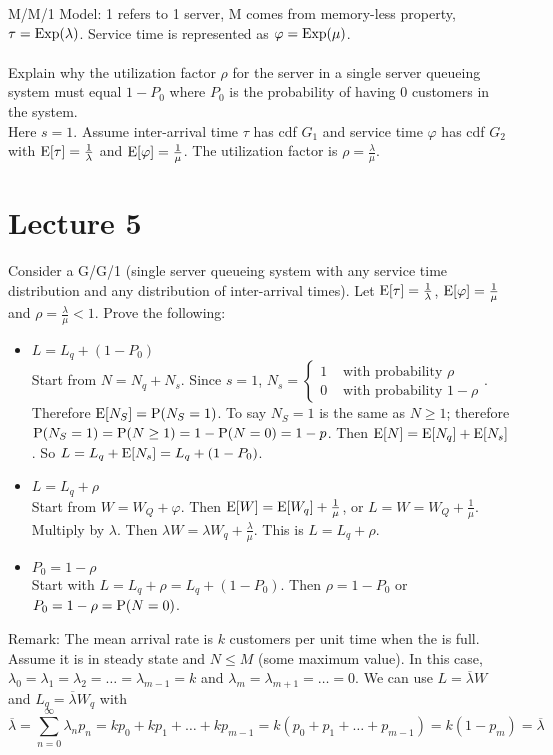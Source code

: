 \documentclass[12pt]{article}
\begin{document}
 M/M/1 Model: 1 refers to 1 server, M comes from memory-less property, $\tau = \text{Exp}( \lambda )$. Service time is represented as $\varphi = \text{Exp}( \mu )$. \\~\\
 Explain why the utilization factor $\rho$ for the server in a single server queueing system must equal $1 - P_0$ where $P_0$ is the probability of having $0$ customers in the system. \\ Here $s = 1$. Assume inter-arrival time $\tau$ has cdf $G_1$ and service time $\varphi$ has cdf $G_2$ with $\mathrm{E}[ \tau ] = \frac{1}{\lambda}$ and $\mathrm{E}[ \varphi ] = \frac{1}{\mu}$. The utilization factor is $\rho = \frac{\lambda}{\mu}$. 
 
  \section{Lecture 5}
 Consider a G/G/1 (single server queueing system with any service time distribution and any distribution of inter-arrival times). Let $\mathrm{E}[ \tau ] = \frac{1}{\lambda}$, $\mathrm{E}[ \varphi ] = \frac{1}{\mu}$ and $\rho = \frac{\lambda}{\mu} < 1$. Prove the following: \begin{itemize} 
 \item $L = L_q + (1- P_0)$ \\ 
 Start from $N = N_q + N_s$. Since $s = 1$, $N_s = \begin{cases} 1 &\text{ with probability } \rho \\ 0 &\text{ with probability } 1-\rho \end{cases} $. Therefore $\mathrm{E}[ N_S ] = \mathrm{P}( N_S = 1 )$. To say $N_S = 1$ is the same as $N \geq 1$; therefore $\mathrm{P}( N_S = 1 ) = \mathrm{P}( N \geq 1 ) = 1 - \mathrm{P}( N = 0 ) = 1 - p$.  Then $\mathrm{E}[ N ] = \mathrm{E}[ N_q ] + \mathrm{E}[ N_s ]$. So $L = L_q + \mathrm{E}[ N_s ] = L_q + (1 - P_0)$. 
 \item $L = L_q + \rho$  \\
 Start from $W = W_Q + \varphi$. Then $\mathrm{E}[ W ] = \mathrm{E}[ W_q ] + \frac{1}{\mu}$, or $L = W = W_Q + \frac{1}{\mu}$. Multiply by $\lambda$. Then $\lambda W = \lambda W_q + \frac{\lambda}{\mu}$. This is $L = L_q + \rho$. 
 \item $P_0 = 1 - \rho$ \\ Start with $L = L_q + \rho = L_q + (1 - P_0)$. Then $\rho = 1 - P_0$ or $P_0 = 1 - \rho = \mathrm{P}( N = 0 )$. 
 \end{itemize} 
 Remark: The mean arrival rate is $k$ customers per unit time when the \qs is full. Assume it is in steady state and $N \leq M$ (some maximum value). In this case, $\lambda_0 = \lambda_1 = \lambda_2 = \dots = \lambda_{m-1} = k$ and $\lambda_m = \lambda_{m+1} = \dots = 0$. We can use $L = \overline{\lambda}W $ and $L_q = \overline{\lambda}W_q$ with $$\overline{\lambda} = \sum_{n=0}^\infty \lambda_np_n = kp_0 + kp_1 + \dots + kp_{m-1} = k(p_0 + p_1 + \dots + p_{m-1}) = k(1 - p_m) = \overline{\lambda} $$ 
\end{document}
